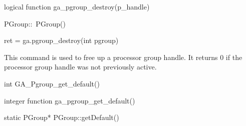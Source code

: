 \documentclass[12pt]{article}
\begin{document}
\begin{fapi}
\begin{fcode}
logical function ga_pgroup_destroy(p_handle)
\end{fcode}
\begin{funcargs}
\end{funcargs}
\end{fapi}

\begin{cxxapi}
\begin{cxxcode}
PGroup::~PGroup()
\end{cxxcode}
\end{cxxapi}

\begin{pyapi}
\begin{pycode}
ret = ga.pgroup_destroy(int pgroup)
\end{pycode}
\begin{funcargs}
\end{funcargs}
\end{pyapi}

\gcoll

\begin{desc}

This command is used to free up a processor group handle. It returns 0 if the
processor group handle was not previously active.

\end{desc}



\begin{capi}
\begin{ccode}
int GA_Pgroup_get_default()
\end{ccode}
\end{capi}

\begin{fapi}
\begin{fcode}
integer function ga_pgroup_get_default()
\end{fcode}
\end{fapi}

\begin{cxxapi}
\begin{cxxcode}
static PGroup* PGroup::getDefault()
\end{cxxcode}
\end{cxxapi}
\end{document}
